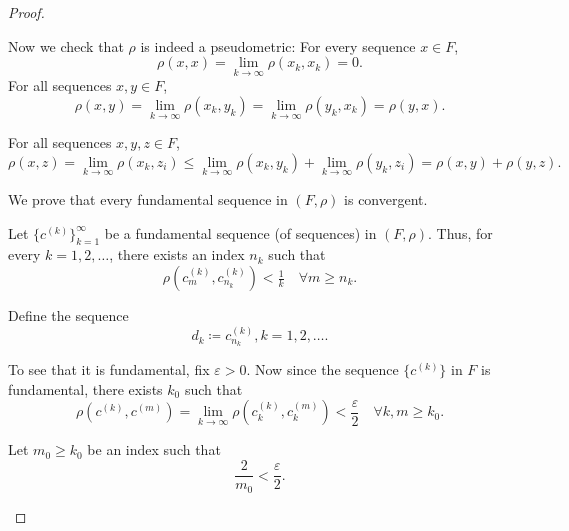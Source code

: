 \begin{proof}
\begin{thmenum}
    Now we check that \( \rho \) is indeed a pseudometric:
     For every sequence \( x \in F \),
    \begin{equation*}
      \rho(x, x) = \lim_{k \to \infty} \rho(x_k, x_k) = 0.
    \end{equation*}
     For all sequences \( x, y \in F \),
    \begin{equation*}
      \rho(x, y) = \lim_{k \to \infty} \rho(x_k, y_k) = \lim_{k \to \infty} \rho(y_k, x_k) = \rho(y, x).
    \end{equation*}

     For all sequences \( x, y, z \in F \),
    \begin{equation*}
      \rho(x, z) = \lim_{k \to \infty} \rho(x_k, z_i) \leq \lim_{k \to \infty} \rho(x_k, y_k) + \lim_{k \to \infty} \rho(y_k, z_i) = \rho(x, y) + \rho(y, z).
    \end{equation*}

     We prove that every fundamental sequence in \( (F, \rho) \) is convergent.

    Let \( \{ c^{(k)} \}_{k=1}^\infty \) be a fundamental sequence (of sequences) in \( (F, \rho) \). Thus, for every \( k = 1, 2, \ldots \), there exists an index \( n_k \) such that
    \begin{equation*}
      \rho(c_m^{(k)}, c_{n_k}^{(k)}) < \tfrac 1 k \quad\forall m \geq n_k.
    \end{equation*}

    Define the sequence
    \begin{equation*}
      d_k \coloneqq c_{n_k}^{(k)}, k = 1, 2, \ldots.
    \end{equation*}

    To see that it is fundamental, fix \( \varepsilon > 0 \). Now since the sequence \( \{ c^{(k)} \} \) in \( F \) is fundamental, there exists \( k_0 \) such that
    \begin{equation*}
      \rho(c^{(k)}, c^{(m)}) = \lim_{k \to \infty} \rho(c_k^{(k)}, c_k^{(m)}) < \frac \varepsilon 2 \quad\forall k, m \geq k_0.
    \end{equation*}

    Let \( m_0 \geq k_0 \) be an index such that
    \begin{equation*}
      \frac 2 {m_0} < \frac \varepsilon 2.
    \end{equation*}


\end{thmenum}
\end{proof}
